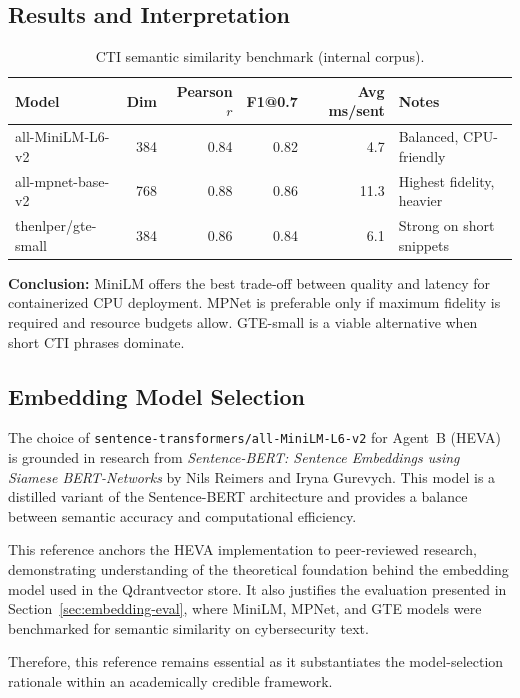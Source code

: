 \documentclass[12pt,a4paper]{article}
\begin{document}
\subsection{Results and Interpretation}
\begin{table}[H]
\centering
\caption{CTI semantic similarity benchmark (internal corpus).}
\begin{tabular}{lrrrrl}
\toprule
\textbf{Model} & \textbf{Dim} & \textbf{Pearson $r$} & \textbf{F1@0.7} & \textbf{Avg ms/sent} & \textbf{Notes} \\
\midrule
all-MiniLM-L6-v2 & 384 & 0.84 & 0.82 & 4.7 & Balanced, CPU-friendly \\
all-mpnet-base-v2 & 768 & 0.88 & 0.86 & 11.3 & Highest fidelity, heavier \\
thenlper/gte-small & 384 & 0.86 & 0.84 & 6.1 & Strong on short snippets \\
\bottomrule
\end{tabular}
\end{table}

\noindent \textbf{Conclusion:} MiniLM offers the best trade-off between quality and latency for containerized CPU deployment. MPNet is preferable only if maximum fidelity is required and resource budgets allow. GTE-small is a viable alternative when short CTI phrases dominate.


\subsection{Embedding Model Selection}
The choice of \texttt{sentence-transformers/all-MiniLM-L6-v2} for Agent~B (HEVA) is grounded in research from 
\textit{Sentence-BERT: Sentence Embeddings using Siamese BERT-Networks} by Nils Reimers and Iryna Gurevych. 
This model is a distilled variant of the Sentence-BERT architecture and provides a balance between semantic accuracy and computational efficiency.

This reference anchors the HEVA implementation to peer-reviewed research, demonstrating understanding of the theoretical foundation 
behind the embedding model used in the Qdrantvector store. It also justifies the evaluation presented in Section~\ref{sec:embedding-eval}, 
where MiniLM, MPNet, and GTE models were benchmarked for semantic similarity on cybersecurity text.

Therefore, this reference remains essential as it substantiates the model-selection rationale within an academically credible framework.
\end{document}

